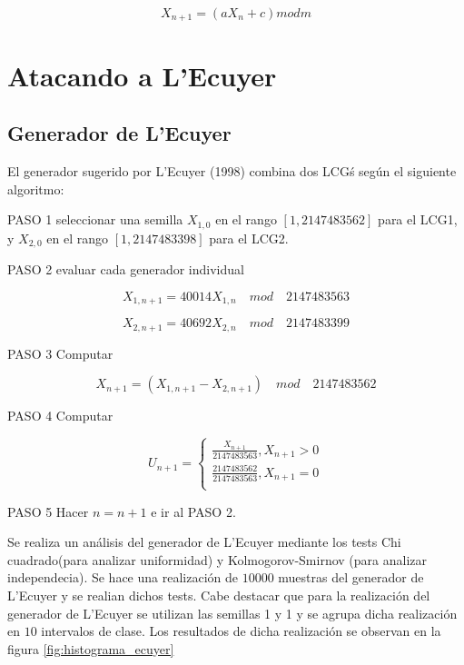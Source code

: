 \documentclass{sig-alternate}
\begin{document}
\begin{equation}
\label{eq:lcg}
X_{n+1} = (aX_{n}+c) mod m
\end{equation}

\section{Atacando a L'Ecuyer}
\label{sec:goingdown}

\subsection{Generador de L'Ecuyer}
\label{sec:ecuyer_intro}
El generador sugerido por L'Ecuyer (1998) combina dos LCG\'s seg\'un el
siguiente algoritmo:
\par PASO 1 seleccionar una semilla $X_{1,0}$ en el rango $[1,2147483562]$ para el 
LCG1, y $X_{2,0}$ en el rango $[1,2147483398]$ para el LCG2.
\par PASO 2 evaluar cada generador individual

\begin{equation}
	X_{1,n+1} = 40014 X_{1,n} \quad mod \quad 2147483563
\end{equation}

\begin{equation}
	X_{2,n+1} = 40692 X_{2,n} \quad mod \quad 2147483399
\end{equation}


\par PASO 3 Computar

\begin{equation}
	X_{n+1} = (X_{1,n+1} - X_{2,n+1} ) \quad mod \quad 2147483562
\end{equation}

\par PASO 4 Computar

\begin{equation}
	U_{n+1} =
	\begin{cases}
		\frac{X_{n+1}}{2147483563}, X_{n+1} > 0 \\
		\frac{2147483562}{2147483563}, X_{n+1} = 0 \\
	\end{cases}
\end{equation}

\par PASO 5 Hacer $n = n + 1$ e ir al PASO 2.

Se realiza un an\'alisis del generador de L'Ecuyer mediante los tests
Chi cuadrado(para analizar uniformidad) y Kolmogorov-Smirnov
(para analizar independecia).
Se hace una realizaci\'on de $10000$ muestras del generador de L'Ecuyer y se realian dichos tests.
Cabe destacar que para la realizaci\'on del generador de L'Ecuyer se utilizan las semillas 1 y 1 y
se agrupa dicha realizaci\'on en $10$ intervalos de clase. Los resultados de dicha realizaci\'on 
se observan en la figura \ref{fig:histograma_ecuyer}
\end{document}
